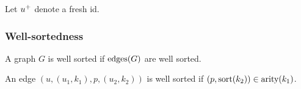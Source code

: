 

Let ${u}^{+}$ denote a fresh id.


\subsubsection{Well-sortedness}

\begin{definition}
  A graph $G$ is well sorted if $\text{edges}\mathopen{}\left(G\right)\mathclose{}$ are well sorted.
\end{definition}

\begin{definition}
  An edge $(u, (u_1, k_1), p, (u_2, k_2))$ is well sorted if $(p, \operatorname{\text{sort}}\mathopen{}\left(k_2\right)\mathclose{}) \in \operatorname{\text{arity}}\mathopen{}\left(k_1\right)\mathclose{}$.
\end{definition}


